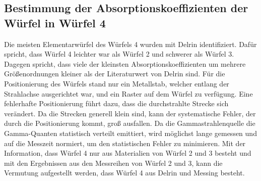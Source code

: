 \subsection{Bestimmung der Absorptionskoeffizienten der Würfel in Würfel 4}

Die meisten Elementarwürfel des Würfels 4 wurden mit Delrin identifiziert. Dafür spricht, dass Würfel 4 leichter war 
als Würfel 2 und schwerer als Würfel 3. Dagegen spricht, dass viele der kleinsten Absorptionskoeffizienten 
um mehrere Größenordnungen kleiner als der Literaturwert von 
Delrin sind.
Für die Positionierung des Würfels stand nur ein Metallstab, welcher entlang der Strahlachse ausgerichtet war, und ein Raster auf dem Würfel zu verfügung.
Eine fehlerhafte Positionierung führt dazu, dass die durchstrahlte Strecke sich verändert. Da die Strecken generell klein sind, 
kann der systematische Fehler, der durch die Positionierung kommt, groß ausfallen. Da die Gammastrahlenquelle die 
Gamma-Quanten statistisch verteilt emittiert, wird möglichst lange gemessen und auf die Messzeit normiert, um den statistischen 
Fehler zu minimieren.
Mit der Information, dass Würfel 4 nur aus Materialien von Würfel 2 und 3 besteht und mit den Ergebnissen aus den Messreihen
von Würfel 2 und 3, kann die Vermutung aufgestellt werden, dass Würfel 4 aus Delrin und Messing besteht. 
\newpage